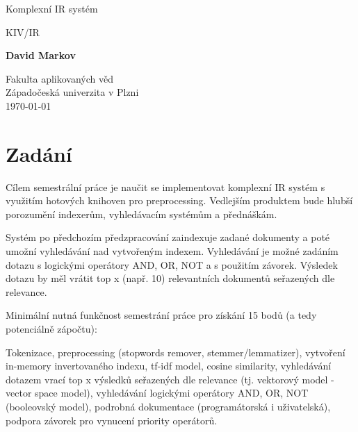 \documentclass{article}
\begin{document}
\begin{titlepage}
   \begin{center}
       \vspace*{1cm}
        \Huge

       \vspace{0.5cm}
        Komplexní IR systém\
        
        KIV/IR
            
       \vspace{1.5cm}

       \textbf{David Markov}

       \vfill
            
            
       \vspace{0.8cm}
     
            
       Fakulta aplikovaných věd\\
       Západočeská univerzita v Plzni\\
       \today
            
   \end{center}
\end{titlepage}

\tableofcontents
\thispagestyle{empty}
\newpage
\setcounter{page}{1}

\section{Zadání}
Cílem semestrální práce je naučit se implementovat komplexní IR systém s využitím hotových knihoven pro preprocessing. Vedlejším produktem bude hlubší porozumění indexerům, vyhledávacím systémům a přednáškám.

Systém po předchozím předzpracování zaindexuje zadané dokumenty a poté umožní vyhledávání nad vytvořeným indexem. Vyhledávání je možné zadáním dotazu s logickými operátory AND, OR, NOT a s použitím závorek. Výsledek dotazu by měl vrátit top x (např. 10) relevantních dokumentů seřazených dle relevance.


Minimální nutná funkčnost semestrání práce pro získání 15 bodů (a tedy potenciálně zápočtu):

Tokenizace, preprocessing (stopwords remover, stemmer/lemmatizer), \newline vytvoření in-memory invertovaného indexu, tf-idf model, cosine similarity, \newline vyhledávání dotazem vrací top x výsledků seřazených dle relevance (tj. vektorový model - vector space model), vyhledávání logickými operátory AND, OR, NOT (booleovský model), podrobná dokumentace (programátorská i uživatelská), podpora závorek pro vynucení priority operátorů.
\end{document}
